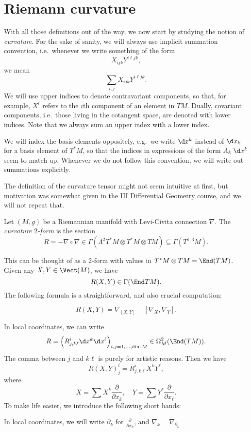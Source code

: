 \documentclass[a4paper]{article}
\begin{document}
\section{Riemann curvature}
With all those definitions out of the way, we now start by studying the notion of \emph{curvature}. For the sake of sanity, we will always use implicit summation convention, i.e.\ whenever we write something of the form
\[
  X_{ijk} Y^{i\ell jk},
\]
we mean
\[
  \sum_{i, j} X_{ijk} Y^{i\ell jk}.
\]
We will use upper indices to denote contravariant components, so that, for example, $X^i$ refers to the $i$th component of an element in $TM$. Dually, covariant components, i.e.\ those living in the cotangent space, are denoted with lower indices. Note that we always sum an upper index with a lower index.

We will index the basis elements oppositely, e.g.\ we write $\d x^k$ instead of $\d x_k$ for a basis element of $T^*M$, so that the indices in expressions of the form $A_k \;\d x^k$ seem to match up. Whenever we do not follow this convention, we will write out summations explicitly.

The definition of the curvature tensor might not seem intuitive at first, but motivation was somewhat given in the III Differential Geometry course, and we will not repeat that.

\begin{defi}[Curvature]
  Let $(M, g)$ be a Riemannian manifold with Levi-Civita connection $\nabla$. The \emph{curvature $2$-form} is the section
  \[
    R = - \nabla \circ \nabla \in \Gamma(\Lambda^2 T^*M \otimes T^*M \otimes TM) \subseteq \Gamma(T^{1, 3}M).
  \]
\end{defi}
This can be thought of as a $2$-form with values in $T^*M \otimes TM = \End(TM)$. Given any $X, Y \in \Vect(M)$, we have
\[
  R(X, Y) \in \Gamma(\End TM) .
\]
The following formula is a straightforward, and also crucial computation:
\begin{prop}
  \[
    R(X, Y) = \nabla_{[X, Y]} - [\nabla_X, \nabla_Y].
  \]
\end{prop}

In local coordinates, we can write
\[
  R = \Big(R^i_{j, k\ell} \d x^k \d x^\ell\Big)_{i, j = 1, \ldots, \dim M} \in \Omega_M^2(\End(TM)).
\]
The comma between $j$ and $k\ell$ is purely for artistic reasons. Then we have
\[
  R(X, Y)^i_j = R^i_{j, k\ell} X^k Y^\ell,
\]
where
\[
  X = \sum X^k \frac{\partial}{\partial x_k},\quad Y = \sum Y^\ell \frac{\partial}{\partial x_\ell}.
\]
To make life easier, we introduce the following short hands:
\begin{notation}
  In local coordinates, we will write $\partial_k$ for $\frac{\partial}{\partial x_k}$, and $\nabla_k = \nabla_{\partial_k}$
\end{notation}
\end{document}
